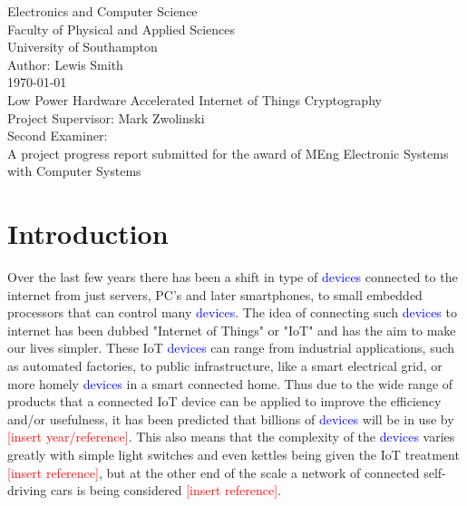 \documentclass[12pt,twoside,a4paper]{report}
\begin{document}
    
    \begin{titlepage}
    \begin{center}
        \Huge
        Electronics and Computer Science
        \\Faculty of Physical and Applied Sciences
        \\University of Southampton
        \Large
        \\[4cm]Author: Lewis Smith
        \\[1cm]\today
        \Huge
        \\[2cm]Low Power Hardware Accelerated Internet of Things Cryptography
        \large
        \\[4cm]Project Supervisor: Mark Zwolinski
        \\Second Examiner:
        \\[4cm]A project progress report submitted for the award of MEng Electronic Systems with Computer Systems
        
    \end{center}
    \end{titlepage}
    
    \begin{abstract}
    
    \lipsum[1-2]
    
    \end{abstract}
    
    \tableofcontents
    
	\chapter{Introduction}
    Over the last few years there has been a shift in type of \textcolor{blue}{devices} connected to the internet from just servers, PC's and later smartphones, to small embedded processors that can control many \textcolor{blue}{devices}. The idea of connecting such \textcolor{blue}{devices} to internet has been dubbed "Internet of Things" or "IoT" and has the aim to make our lives simpler. These IoT \textcolor{blue}{devices} can range from industrial applications, such as automated factories, to public infrastructure, like a smart electrical grid, or more homely \textcolor{blue}{devices} in a smart connected home. Thus due to the wide range of products that a connected IoT device can be applied to improve the efficiency and/or usefulness, it has been predicted that billions of \textcolor{blue}{devices} will be in use by \textcolor{red}{[insert year/reference]}. This also means that the complexity of the \textcolor{blue}{devices} varies greatly with simple light switches and even kettles being given the IoT treatment \textcolor{red}{[insert reference]}, but at the other end of the scale a network of connected self-driving cars is being considered \textcolor{red}{[insert reference]}.
    
\end{document}
